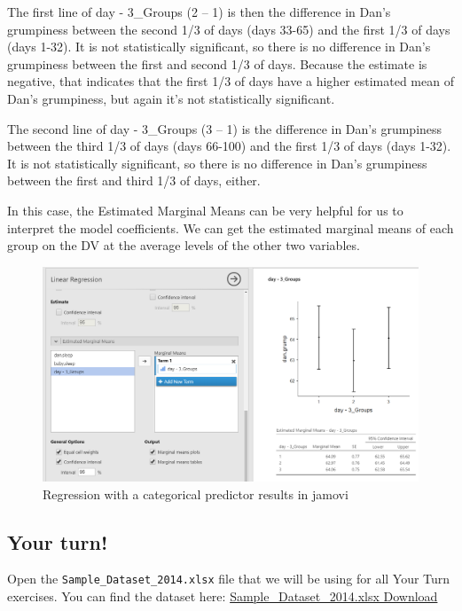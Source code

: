 \documentclass[
]{book}
\begin{document}
The first line of day - 3\_Groups (2 -- 1) is then the difference in Dan's grumpiness between the second 1/3 of days (days 33-65) and the first 1/3 of days (days 1-32). It is not statistically significant, so there is no difference in Dan's grumpiness between the first and second 1/3 of days. Because the estimate is negative, that indicates that the first 1/3 of days have a higher estimated mean of Dan's grumpiness, but again it's not statistically significant.

The second line of day - 3\_Groups (3 -- 1) is the difference in Dan's grumpiness between the third 1/3 of days (days 66-100) and the first 1/3 of days (days 1-32). It is not statistically significant, so there is no difference in Dan's grumpiness between the first and third 1/3 of days, either.

In this case, the Estimated Marginal Means can be very helpful for us to interpret the model coefficients. We can get the estimated marginal means of each group on the DV at the average levels of the other two variables.

\begin{figure}

{\centering \includegraphics[width=1\linewidth]{images/13-regression/regression-categorical-EMM} 

}

\caption{Regression with a categorical predictor results in jamovi}\label{fig:unnamed-chunk-15}
\end{figure}

\hypertarget{your-turn-9}{%
\subsection{Your turn!}\label{your-turn-9}}

Open the \texttt{Sample\_Dataset\_2014.xlsx} file that we will be using for all Your Turn exercises. You can find the dataset here: \href{https://github.com/danawanzer/stats-with-jamovi/blob/master/data/Sample_Dataset_2014.xlsx}{Sample\_Dataset\_2014.xlsx Download}
\end{document}
